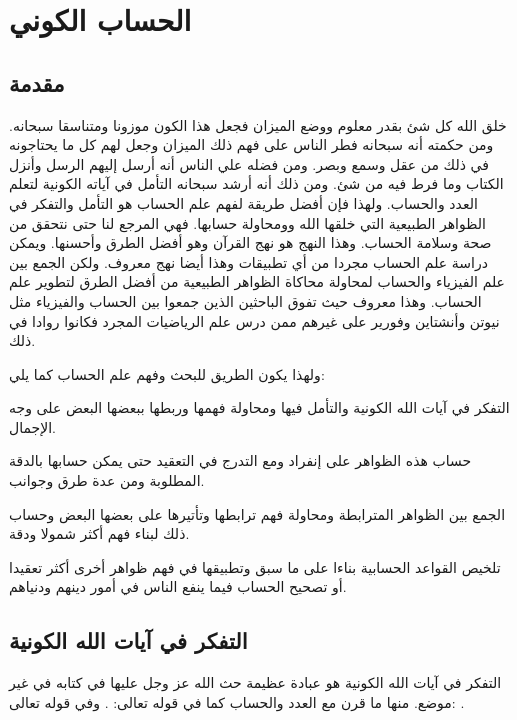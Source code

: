 \chapter{الحساب الكوني}


\section{مقدمة}

خلق الله كل شئ بقدر معلوم ووضع الميزان فجعل هذا الكون موزونا ومتناسقا سبحانه. ومن حكمته أنه سبحانه فطر الناس على فهم ذلك الميزان وجعل لهم كل ما يحتاجونه في ذلك من عقل وسمع وبصر. ومن فضله علي الناس أنه أرسل إليهم الرسل وأنزل الكتاب وما فرط فيه من شئ. ومن ذلك أنه أرشد سبحانه التأمل في آياته الكونية لتعلم العدد والحساب. ولهذا فإن أفضل طريقة لفهم علم الحساب هو التأمل والتفكر في الظواهر الطبيعية التي خلقها الله وومحاولة حسابها. فهي المرجع لنا حتى نتحقق من صحة وسلامة الحساب. وهذا النهج هو نهج القرآن وهو أفضل الطرق وأحسنها. ويمكن دراسة علم الحساب مجردا من أي تطبيقات وهذا أيضا نهج معروف. ولكن الجمع بين علم الفيزياء والحساب لمحاولة محاكاة الظواهر الطبيعية من أفضل الطرق لتطوير علم الحساب. وهذا معروف حيث تفوق الباحثين الذين جمعوا بين الحساب والفيزياء مثل نيوتن وأنشتاين وفورير على غيرهم ممن درس علم الرياضيات المجرد فكانوا روادا في ذلك.

ولهذا يكون الطريق للبحث وفهم علم الحساب كما يلي:
\begin{compactenum}
  \item التفكر في آيات الله الكونية والتأمل فيها ومحاولة فهمها وربطها ببعضها البعض على وجه الإجمال.
  \item حساب هذه الظواهر على إنفراد ومع التدرج في التعقيد حتى يمكن حسابها بالدقة المطلوبة ومن عدة طرق وجوانب.
  \item الجمع بين الظواهر المترابطة ومحاولة فهم ترابطها وتأتيرها على بعضها البعض وحساب ذلك لبناء فهم أكثر شمولا ودقة.
  \item تلخيص القواعد الحسابية بناءا على ما سبق وتطبيقها في فهم ظواهر أخرى أكثر تعقيدا أو تصحيح الحساب فيما ينفع الناس في أمور دينهم ودنياهم.
\end{compactenum}

\section{التفكر في آيات الله الكونية}
التفكر في آيات الله الكونية هو عبادة عظيمة حث الله عز وجل عليها في كتابه في غير موضع. منها ما قرن مع العدد والحساب كما في قوله تعالى:
\quranayah*[17][12]{\footnotesize \surahname*[17]}.
وفي قوله تعالى: \quranayah*[10][5]{\footnotesize \surahname*[10]}.

